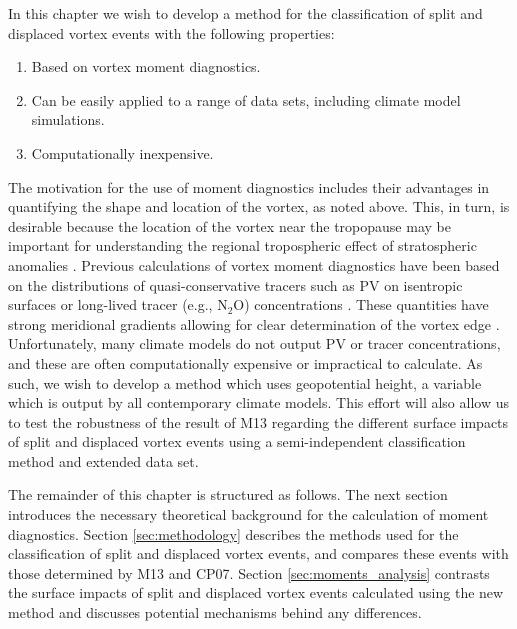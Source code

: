 In this chapter we wish to develop a method for the classification of split and
displaced vortex events with the following properties:
\begin{enumerate}
\item Based on vortex moment diagnostics.
\item Can be easily applied to a range of data sets, including climate model
  simulations.
\item Computationally inexpensive. 
\end{enumerate}
The motivation for the use of moment diagnostics includes their advantages in
quantifying the shape and location of the vortex, as noted above. This, in turn,
is desirable because the location of the vortex near the tropopause may be
important for understanding the regional tropospheric effect of stratospheric
anomalies \citep[e.g.,][Section \ref{sec:mechanisms}]{Ambaum2002}. Previous
calculations of vortex moment diagnostics have been based on the distributions
of quasi-conservative tracers such as PV on isentropic surfaces
\citep{Mitchell2011} or long-lived tracer (e.g., N$_{2}$O) concentrations
\citep{Waugh1997}. These quantities have strong meridional gradients allowing
for clear determination of the vortex edge \citep{Nash1996}. Unfortunately, many
climate models do not output PV or tracer concentrations, and these are often
computationally expensive or impractical to calculate. As such, we wish to
develop a method which uses geopotential height, a variable which is output by
all contemporary climate models. This effort will also allow us to test the
robustness of the result of M13 regarding the different surface impacts of split
and displaced vortex events using a semi-independent classification method and
extended data set.

The remainder of this chapter is structured as follows. The next section
introduces the necessary theoretical background for the calculation of moment
diagnostics. Section \ref{sec:methodology} describes the methods used for the
classification of split and displaced vortex events, and compares these events
with those determined by M13 and CP07. Section \ref{sec:moments_analysis}
contrasts the surface impacts of split and displaced vortex events calculated
using the new method and discusses potential mechanisms behind any differences. 


